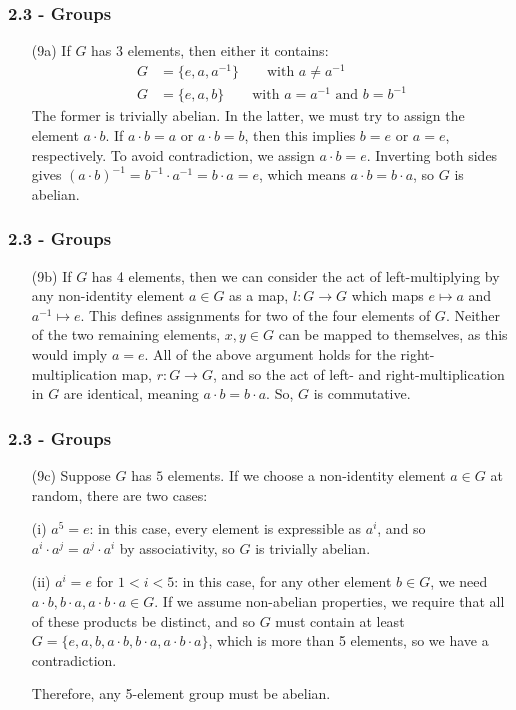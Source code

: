 \documentclass{beamer}
\begin{document}
\begin{frame}
\frametitle{2.3 - Groups}
\small
\begin{enumerate}
	\item[(9a)] If $G$ has 3 elements, then either it contains:
	\begin{align*}
	G &= \{e, a, a^{-1}\}\qquad\text{with } a\neq a^{-1}\\
	G &= \{e, a, b\}\qquad\text{with } a = a^{-1}\text{ and }b=b^{-1}
	\end{align*}
	The former is trivially abelian. In the latter, we must try to assign the element $a\cdot b$. If $a\cdot b = a$ or $a\cdot b = b$, then this implies $b=e$ or $a=e$, respectively. To avoid contradiction, we assign $a\cdot b = e$. Inverting both sides gives $(a\cdot b)^{-1} = b^{-1}\cdot a^{-1} = b\cdot a = e$, which means $a\cdot b = b\cdot a$, so $G$ is abelian.
\end{enumerate}
\end{frame}
\begin{frame}
\frametitle{2.3 - Groups}
\small
\begin{enumerate}
	\item[(9b)] If $G$ has 4 elements, then we can consider the act of left-multiplying by any non-identity element $a\in G$ as a map, $l: G\to G$ which maps $e\mapsto a$ and $a^{-1}\mapsto e$. This defines assignments for two of the four elements of $G$. Neither of the two remaining elements, $x,y\in G$ can be mapped to themselves, as this would imply $a=e$. All of the above argument holds for the right-multiplication map, $r: G\to G$, and so the act of left- and right-multiplication in $G$ are identical, meaning $a\cdot b = b\cdot a$. So, $G$ is commutative.
\end{enumerate}
\end{frame}
\begin{frame}
\frametitle{2.3 - Groups}
\small
\begin{enumerate}
	\item[(9c)] Suppose $G$ has $5$ elements. If we choose a non-identity element $a\in G$ at random, there are two cases:
	
	\quad (i) $a^5 = e$: in this case, every element is expressible as $a^i$, and so $a^i\cdot a^j = a^j\cdot a^i$ by associativity, so $G$ is trivially abelian.
	
	\quad (ii) $a^i = e$ for $1 < i < 5$: in this case, for any other element $b\in G$, we need $a\cdot b, b\cdot a, a\cdot b\cdot a\in G$. If we assume non-abelian properties, we require that all of these products be distinct, and so $G$ must contain at least $G =\{e, a, b, a\cdot b, b\cdot a, a\cdot b\cdot a\}$, which is more than 5 elements, so we have a contradiction.

	\quad Therefore, any 5-element group must be abelian.
\end{enumerate}
\end{frame}
\end{document}

